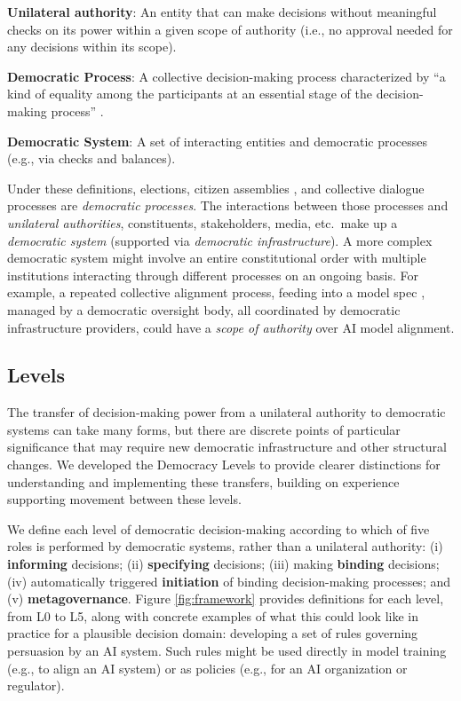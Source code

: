 \documentclass{article}
\begin{document}
    \textbf{Unilateral authority}: An entity that can make decisions without meaningful checks on its power within a given scope of authority (i.e., no approval needed for any decisions within its scope).

    \textbf{Democratic Process}: A collective decision-making process characterized by ``a kind of equality among the participants at an essential stage of the decision-making process'' \cite{christiano2024}. 
    
    \textbf{Democratic System}: A set of interacting entities and democratic processes (e.g., via checks and balances).
    
\newpage

    Under these definitions, elections, citizen assemblies \cite{oecd2020}, and collective dialogue processes \cite{konya2023, ovadya2023b} are \textit{democratic processes}. The interactions between those processes and \textit{unilateral authorities}, constituents, stakeholders, media, etc.~make up a \textit{democratic system} (supported via \textit{democratic infrastructure}). A more complex democratic system might involve an entire constitutional order with multiple institutions interacting through different processes on an ongoing basis. For example, a repeated collective alignment process, feeding into a model spec \cite{openai2024}, managed by a democratic oversight body, all coordinated by democratic infrastructure providers, could have a \textit{scope of authority} over AI model alignment.

\subsection{Levels}
\label{sec:levels}

    The transfer of decision-making power from a unilateral authority to democratic systems can take many forms, but there are discrete points of particular significance that may require new democratic infrastructure and other structural changes. We developed the Democracy Levels to provide clearer distinctions for understanding and implementing these transfers, building on experience supporting movement between these levels. 

    We define each level of democratic decision-making according to which of five roles is performed by democratic systems, rather than a unilateral authority: (i) \textbf{informing} decisions; (ii) \textbf{specifying} decisions; (iii) making \textbf{binding} decisions; (iv) automatically triggered \textbf{initiation} of binding decision-making processes; and (v) \textbf{metagovernance}. 
    Figure \ref{fig:framework} provides definitions for each level, from L0 to L5, along with concrete examples of what this could look like in practice for a plausible decision domain: developing a set of rules governing persuasion by an AI system. Such rules might be used directly in model training (e.g., to align an AI system) \cite{mu2024} or as policies (e.g., for an AI organization or regulator).
\end{document}
